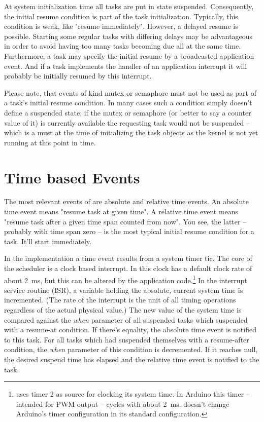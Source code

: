 At system initialization time all tasks are put in state suspended.
Consequently, the initial resume condition is part of the task
initialization. Typically, this condition is weak, like "resume
immediately". However, a delayed resume is possible. Starting some regular
tasks with differing delays may be advantageous in order to avoid having
too many tasks becoming due all at the same time. Furthermore, a task may
specify the initial resume by a broadcasted application event. And if a
task implements the handler of an application interrupt it will probably
be initially resumed by this interrupt.

Please note, that events of kind mutex or semaphore must not be used as
part of a task's initial resume condition. In many cases such a condition
simply doesn't define a suspended state; if the mutex or semaphore (or
better to say a counter value of it) is currently available the requesting
task would not be suspended -- which is a must at the time of
initializing the task objects as the \rtos{} kernel is not yet running at
this point in time.



\section{Time based Events}
\label{secTimeBasedEvents}

The most relevant events of \rtos{} are absolute and relative time events.
An absolute time event means "resume task at given time". A relative time
event means "resume task after a given time span counted from now". You
see, the latter -- probably with time span zero -- is the most typical
initial resume condition for a task. It'll start immediately.

In the implementation a time event results from a system timer tic. The
core of the scheduler is a clock based interrupt. In \rtos{} this clock
has a default clock rate of about 2~ms, but this can be altered by the
application code.\footnote{\rtos{} uses timer 2 as source for clocking its
system time. In Arduino this timer -- intended for PWM output -- cycles
with about 2~ms. \rtos doesn't change Arduino's timer configuration in its
standard configuration.} In the interrupt service routine (ISR), a
variable holding the absolute, current system time is incremented. (The
rate of the interrupt is the unit of all timing operations regardless of
the actual physical value.) The new value of the system time is compared
against the \emph{when} parameter of all suspended tasks which suspended
with a resume-at condition. If there's equality, the absolute time event
is notified to this task. For all tasks which had suspended themselves
with a resume-after condition, the \emph{when} parameter of this condition
is decremented. If it reaches null, the desired suspend time has elapsed
and the relative time event is notified to the task.

